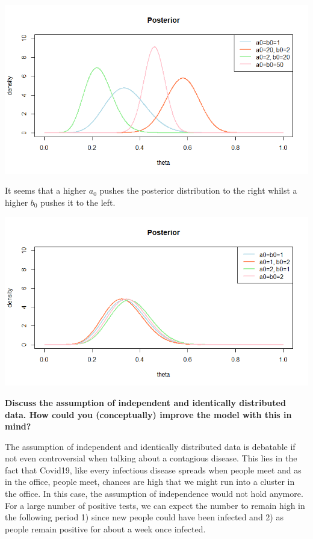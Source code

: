 \documentclass{article}
\begin{document}
\includegraphics{Figures and Plots/figure-latex/Rplot 2 posterior.png}

It seems that a higher $a_0$ pushes the posterior distribution to the right whilst a higher $b_0$ pushes it to the left. 

\includegraphics{Figures and Plots/figure-latex/Rplot 2 parameters.png}

\newpage
\begin{center}
    \textbf{Discuss the assumption of independent and identically distributed data. How could you (conceptually)
improve the model with this in mind?
}
\end{center}

\vspace{2em}

The assumption of independent and identically distributed data is debatable if not even controversial when talking about a contagious disease. This lies in the fact that Covid19, like every infectious disease spreads when people meet and as in the office, people meet, chances are high that we might run into a cluster in the office. In this case, the assumption of independence would not hold anymore. For a large number of positive tests, we can expect the number to remain high in the following period 1) since new people could have been infected and 2) as people remain positive for about a week once infected.  \par 
\end{document}
